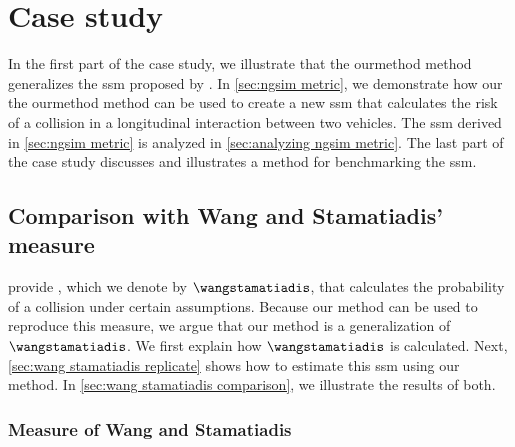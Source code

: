 \section{Case study}
\label{sec:case study}

In the first part of the case study, we illustrate that the \ac{ourmethod} method generalizes the \ac{ssm} proposed by \textcite{wang2014evaluation}.
In \cref{sec:ngsim metric}, we demonstrate how our the \ac{ourmethod} method can be used to create a new \ac{ssm} that calculates the risk of a collision in a longitudinal interaction between two vehicles.
The \ac{ssm} derived in \cref{sec:ngsim metric} is analyzed in \cref{sec:analyzing ngsim metric}.
The last part of the case study discusses and illustrates a method for benchmarking the \ac{ssm}.



\subsection{Comparison with Wang and Stamatiadis' measure}
\label{sec:wang stamatiadis}

\textcite{wang2014evaluation} provide , \cstartb which we denote by $\wangstamatiadis$, \cendb that calculates the probability of a collision under certain assumptions. 
Because our method can be used to reproduce this measure, we argue that our method is a generalization of $\wangstamatiadis$.
We first explain how $\wangstamatiadis$ is calculated. 
Next, \cref{sec:wang stamatiadis replicate} shows how to estimate this \ac{ssm} using our method.
In \cref{sec:wang stamatiadis comparison}, we illustrate the results of both.



\subsubsection{Measure of Wang and Stamatiadis}
\label{sec:wang stamatiadis explanation}

